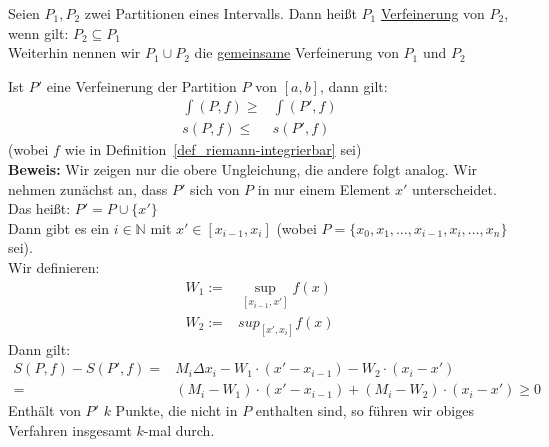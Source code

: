 \begin{Definition}{
	Seien $P_1, P_2$ zwei Partitionen eines Intervalls. Dann heißt $P_1$ 
	\underline{Verfeinerung} von $P_2$, wenn gilt: $P_2 \subseteq P_1$ \\
	Weiterhin nennen wir $P_1 \cup P_2$ die \underline{gemeinsame} Verfeinerung 
	von $P_1$ und $P_2$
}\end{Definition}

\begin{Satz}{
	Ist $P'$ eine Verfeinerung der Partition $P$ von $[a,b]$, dann gilt:
	\begin{align*}
		\int (P,f) \geq & \int (P',f) \\
		s(P,f) \leq & s(P',f)
	\end{align*}
	(wobei $f$ wie in Definition~\ref{def_riemann-integrierbar}
	sei) \\
	\textbf{Beweis:} Wir zeigen nur die obere Ungleichung, die andere folgt analog. 
	Wir nehmen zunächst an, dass $P'$ sich von $P$ in nur einem Element $x'$ 
	unterscheidet. Das heißt: $P' = P \cup \{x'\}$ \\
	Dann gibt es ein $i \in \mathbb{N}$ mit $x' \in [x_{i-1}, x_i]$ \newline
	(wobei $P = \{x_0, x_1, \hdots, x_{i-1}, x_i, \hdots, x_n \}$ sei).\\
	Wir definieren:
	\begin{align*}
		W_1 := & \sup_{[x_{i-1}, x']} f(x) \\
		W_2 := & sup_{[x', x_i]} f(x)
	\end{align*}
	Dann gilt: 
	\begin{align*}
		S(P,f) - S(P',f) = &M_i \Delta x_i - W_1\cdot (x' - x_{i-1}) - 
		W_2\cdot (x_i - x') \\
		= & (M_i -W_1) \cdot (x' - x_{i-1}) 
		+ (M_i - W_2)\cdot(x_i - x') \geq 0
	\end{align*}
	 Enthält von $P'$ $k$ Punkte, die nicht in $P$ enthalten sind, so führen wir 
	 obiges Verfahren insgesamt $k$-mal durch. 
	
}\end{Satz}

